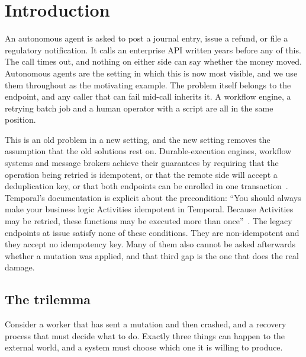 \section{Introduction}
\label{sec:introduction}

An autonomous agent is asked to post a journal entry, issue a refund, or file a
regulatory notification. It calls an enterprise API written years before any of
this. The call times out, and nothing on either side can say whether the money
moved. Autonomous agents are the setting in which this is now most visible, and
we use them throughout as the motivating example. The problem itself belongs to
the endpoint, and any caller that can fail mid-call inherits it. A workflow
engine, a retrying batch job and a human operator with a script are all in the
same position.

This is an old problem in a new setting, and the new setting removes the
assumption that the old solutions rest on. Durable-execution engines, workflow
systems and message brokers achieve their guarantees by requiring that the
operation being retried is idempotent, or that the remote side will accept a
deduplication key, or that both endpoints can be enrolled in one
transaction~\cite{helland2007apostate,burckhardt2021durable,zhuang2023exoflow}.
Temporal's documentation is explicit about the precondition: ``You should
always make your business logic Activities idempotent in Temporal. Because
Activities may be retried, these functions may be executed more than
once''~\cite{temporal-activity-definition}. The legacy endpoints at issue satisfy
none of these conditions. They are non-idempotent and they accept no idempotency
key. Many of them also cannot be asked afterwards whether a mutation was
applied, and that third gap is the one that does the real damage.

\subsection{The trilemma}
\label{sec:trilemma}

Consider a worker that has sent a mutation and then crashed, and a recovery
process that must decide what to do. Exactly three things can happen to the
external world, and a system must choose which one it is willing to produce.

